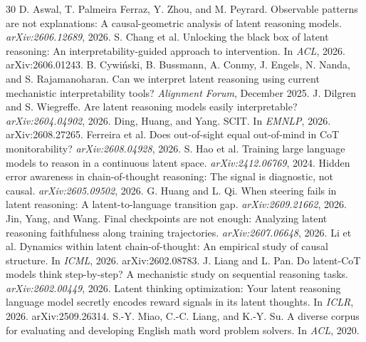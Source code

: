 \documentclass{article}
\begin{document}
\begin{thebibliography}{30}
\small
{} D. Aswal, T. Palmeira Ferraz, Y. Zhou, and M. Peyrard. Observable patterns are not explanations: A causal-geometric analysis of latent reasoning models. \emph{arXiv:2606.12689}, 2026.
 S. Chang et al. Unlocking the black box of latent reasoning: An interpretability-guided approach to intervention. In \emph{ACL}, 2026. arXiv:2606.01243.
 B. Cywi\'nski, B. Bussmann, A. Conmy, J. Engels, N. Nanda, and S. Rajamanoharan. Can we interpret latent reasoning using current mechanistic interpretability tools? \emph{Alignment Forum}, December 2025.
 J. Dilgren and S. Wiegreffe. Are latent reasoning models easily interpretable? \emph{arXiv:2604.04902}, 2026.
 Ding, Huang, and Yang. SCIT. In \emph{EMNLP}, 2026. arXiv:2608.27265.
 Ferreira et al. Does out-of-sight equal out-of-mind in CoT monitorability? \emph{arXiv:2608.04928}, 2026.
 S. Hao et al. Training large language models to reason in a continuous latent space. \emph{arXiv:2412.06769}, 2024.
 Hidden error awareness in chain-of-thought reasoning: The signal is diagnostic, not causal. \emph{arXiv:2605.09502}, 2026.
 G. Huang and L. Qi. When steering fails in latent reasoning: A latent-to-language transition gap. \emph{arXiv:2609.21662}, 2026.
 Jin, Yang, and Wang. Final checkpoints are not enough: Analyzing latent reasoning faithfulness along training trajectories. \emph{arXiv:2607.06648}, 2026.
 Li et al. Dynamics within latent chain-of-thought: An empirical study of causal structure. In \emph{ICML}, 2026. arXiv:2602.08783.
 J. Liang and L. Pan. Do latent-CoT models think step-by-step? A mechanistic study on sequential reasoning tasks. \emph{arXiv:2602.00449}, 2026.
 Latent thinking optimization: Your latent reasoning language model secretly encodes reward signals in its latent thoughts. In \emph{ICLR}, 2026. arXiv:2509.26314.
 S.-Y. Miao, C.-C. Liang, and K.-Y. Su. A diverse corpus for evaluating and developing English math word problem solvers. In \emph{ACL}, 2020.

\end{thebibliography}
\end{document}
